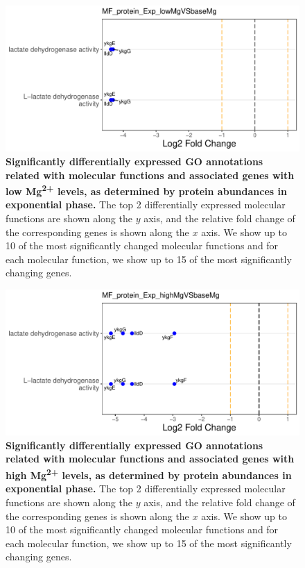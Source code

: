 \documentclass[a4paper]{article}
\begin{document}
\begin{figure}[!htb]
	\includegraphics[width=1.0\textwidth]{../../d_figures/MF11_protein_Exp_lowMgVSbaseMg_withTitle.pdf}
	\caption[Significantly differentially expressed GO annotations associated with molecular functions for protein samples in exponential phase tested for low Mg\textsuperscript{2+} levels against base Mg\textsuperscript{2+} levels]
	{\textbf{Significantly differentially expressed GO annotations related with molecular functions and associated genes with low Mg\textsuperscript{2+} levels, as determined by protein abundances in exponential phase.} The top 2 differentially expressed molecular functions are shown along the $y$ axis, and the relative fold change of the corresponding genes is shown along the $x$ axis. We show up to 10 of the most significantly changed molecular functions and for each molecular function, we show up to 15 of the most significantly changing genes.}
\end{figure}

\begin{figure}[!htb]
	\includegraphics[width=1.0\textwidth]{../../d_figures/MF12_protein_Exp_highMgVSbaseMg_withTitle.pdf}
	\caption[Significantly differentially expressed GO annotations associated with molecular functions for protein samples in exponential phase tested for high Mg\textsuperscript{2+} levels against base Mg\textsuperscript{2+} levels]
	{\textbf{Significantly differentially expressed GO annotations related with molecular functions and associated genes with high Mg\textsuperscript{2+} levels, as determined by protein abundances in exponential phase.} The top 2 differentially expressed molecular functions are shown along the $y$ axis, and the relative fold change of the corresponding genes is shown along the $x$ axis. We show up to 10 of the most significantly changed molecular functions and for each molecular function, we show up to 15 of the most significantly changing genes.}
\end{figure}
\end{document}

